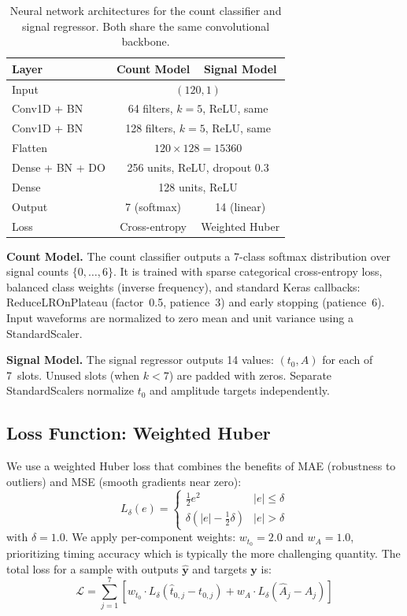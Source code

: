 \documentclass[11pt,twocolumn]{article}
\begin{document}
\begin{table}[t]
\centering
\caption{Neural network architectures for the count classifier and signal regressor. Both share the same convolutional backbone.}
\label{tab:architecture}
\small
\begin{tabular}{lcc}
\toprule
\textbf{Layer} & \textbf{Count Model} & \textbf{Signal Model} \\
\midrule
Input & \multicolumn{2}{c}{$(120, 1)$} \\
Conv1D + BN & \multicolumn{2}{c}{64 filters, $k{=}5$, ReLU, same} \\
Conv1D + BN & \multicolumn{2}{c}{128 filters, $k{=}5$, ReLU, same} \\
Flatten & \multicolumn{2}{c}{$120 \times 128 = 15360$} \\
Dense + BN + DO & \multicolumn{2}{c}{256 units, ReLU, dropout 0.3} \\
Dense & \multicolumn{2}{c}{128 units, ReLU} \\
\midrule
Output & 7 (softmax) & 14 (linear) \\
Loss & Cross-entropy & Weighted Huber \\
\bottomrule
\end{tabular}
\end{table}

\textbf{Count Model.}
The count classifier outputs a 7-class softmax distribution over signal counts $\{0, \ldots, 6\}$.
It is trained with sparse categorical cross-entropy loss, balanced class weights (inverse frequency), and standard Keras callbacks: ReduceLROnPlateau (factor~0.5, patience~3) and early stopping (patience~6).
Input waveforms are normalized to zero mean and unit variance using a StandardScaler.

\textbf{Signal Model.}
The signal regressor outputs 14 values: $(t_0, A)$ for each of 7~slots.
Unused slots (when $k < 7$) are padded with zeros.
Separate StandardScalers normalize $t_0$ and amplitude targets independently.

\subsection{Loss Function: Weighted Huber}

We use a weighted Huber loss that combines the benefits of MAE (robustness to outliers) and MSE (smooth gradients near zero):
\begin{equation}
    L_\delta(e) = \begin{cases}
        \frac{1}{2}e^2 & |e| \leq \delta \\
        \delta(|e| - \frac{1}{2}\delta) & |e| > \delta
    \end{cases}
    \label{eq:huber}
\end{equation}
with $\delta = 1.0$.
We apply per-component weights: $w_{t_0} = 2.0$ and $w_A = 1.0$, prioritizing timing accuracy which is typically the more challenging quantity.
The total loss for a sample with outputs $\hat{\mathbf{y}}$ and targets $\mathbf{y}$ is:
\begin{equation}
    \mathcal{L} = \sum_{j=1}^{7} \left[ w_{t_0} \cdot L_\delta(\hat{t}_{0,j} - t_{0,j}) + w_A \cdot L_\delta(\hat{A}_j - A_j) \right]
\end{equation}
\end{document}
